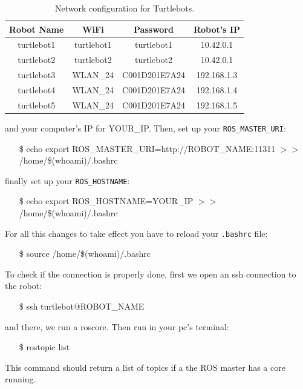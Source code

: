 \documentclass[a4paper,10pt]{article}
\begin{document}
\begin{table}[h!]
	\centering
	\begin{tabular}{|c|c|c|c|}
		\hline
		Robot Name & WiFi & Password & Robot's IP \\ \hline
		turtlebot1 & turtlebot1 & turtlebot1 & 10.42.0.1 \\ \hline
		turtlebot2 & turtlebot2 & turtlebot2 & 10.42.0.1 \\ \hline
		turtlebot3 & WLAN\_24 & C001D201E7A24 & 192.168.1.3 \\ \hline
		turtlebot4 & WLAN\_24 & C001D201E7A24 & 192.168.1.4 \\ \hline
		turtlebot5 & WLAN\_24 & C001D201E7A24 & 192.168.1.5 \\ \hline
	\end{tabular}
    \caption{Network configuration for Turtlebots. }
    \label{tab:ips}
\end{table}
and your computer's IP for YOUR\_IP. Then, set up your \texttt{ROS\_MASTER\_URI}:
\begin{shaded}
	\begin{itemize}
		\item[\$] echo export ROS\_MASTER\_URI=http://ROBOT\_NAME:11311 $>>$ /home/\$(whoami)/.bashrc
	\end{itemize}
\end{shaded}
finally set up your \texttt{ROS\_HOSTNAME}:
\begin{shaded}
	\begin{itemize}
		\item[\$] echo export ROS\_HOSTNAME=YOUR\_IP $>>$ /home/\$(whoami)/.bashrc
	\end{itemize}
\end{shaded}
For all this changes to take effect you have to reload your \texttt{.bashrc} file:
\begin{shaded}
	\begin{itemize}
		\item[\$] source /home/\$(whoami)/.bashrc
	\end{itemize}
\end{shaded}

To check if the connection is properly done, first we open an ssh connection to the robot:
\begin{shaded}
	\begin{itemize}
		\item[\$] ssh turtlebot@ROBOT\_NAME
	\end{itemize}
\end{shaded}
and there, we run a roscore. Then run in your pc's terminal:
\begin{shaded}
	\begin{itemize}
		\item[\$] rostopic list
	\end{itemize}
\end{shaded}
This command should return a list of topics if a the ROS master has a core running.
\end{document}
